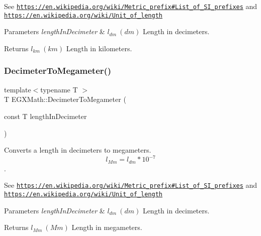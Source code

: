 See \href{https://en.wikipedia.org/wiki/Metric_prefix#List_of_SI_prefixes}{\tt https\+://en.\+wikipedia.\+org/wiki/\+Metric\+\_\+prefix\#\+List\+\_\+of\+\_\+\+S\+I\+\_\+prefixes} and \href{https://en.wikipedia.org/wiki/Unit_of_length}{\tt https\+://en.\+wikipedia.\+org/wiki/\+Unit\+\_\+of\+\_\+length} 
\begin{DoxyParams}{Parameters}
{\em length\+In\+Decimeter} & $ l_{dm}\ (dm)$ Length in decimeters. \\
\hline
\end{DoxyParams}
\begin{DoxyReturn}{Returns}
$ l_{km}\ (km)$ Length in kilometers. 
\end{DoxyReturn}
\mbox{\label{group___e_g_x_math-_conversions-_length_conversions-_decimeter-_s_i_ga093ff7a928de0bc92d2dd57c2c3d0a60}} 
\subsubsection{\texorpdfstring{Decimeter\+To\+Megameter()}{DecimeterToMegameter()}}
{\footnotesize\ttfamily template$<$typename T $>$ \\
T E\+G\+X\+Math\+::\+Decimeter\+To\+Megameter (\begin{DoxyParamCaption}\item[{const T}]{length\+In\+Decimeter }\end{DoxyParamCaption})}



Converts a length in decimeters to megameters. \[ l_{Mm}=l_{dm} * 10^{-7} \]. 

See \href{https://en.wikipedia.org/wiki/Metric_prefix#List_of_SI_prefixes}{\tt https\+://en.\+wikipedia.\+org/wiki/\+Metric\+\_\+prefix\#\+List\+\_\+of\+\_\+\+S\+I\+\_\+prefixes} and \href{https://en.wikipedia.org/wiki/Unit_of_length}{\tt https\+://en.\+wikipedia.\+org/wiki/\+Unit\+\_\+of\+\_\+length} 
\begin{DoxyParams}{Parameters}
{\em length\+In\+Decimeter} & $ l_{dm}\ (dm)$ Length in decimeters. \\
\hline
\end{DoxyParams}
\begin{DoxyReturn}{Returns}
$ l_{Mm}\ (Mm)$ Length in megameters. 
\end{DoxyReturn}
\mbox{\label{group___e_g_x_math-_conversions-_length_conversions-_decimeter-_s_i_ga51fdff755420d79cc7c4cab051a1e820}} 
